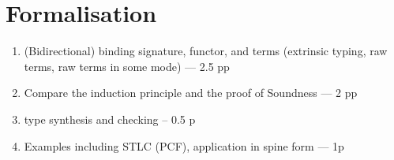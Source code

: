 
\section{Formalisation} \label{sec:formalisation}
\begin{enumerate}
  \item (Bidirectional) binding signature, functor, and terms (extrinsic typing, raw terms, raw terms in some mode) --- 2.5 pp
  \item Compare the induction principle and the \Agda proof of Soundness --- 2 pp
  \item type synthesis and checking -- 0.5 p
  \item Examples including STLC (PCF), application in spine form --- 1p
\end{enumerate}

